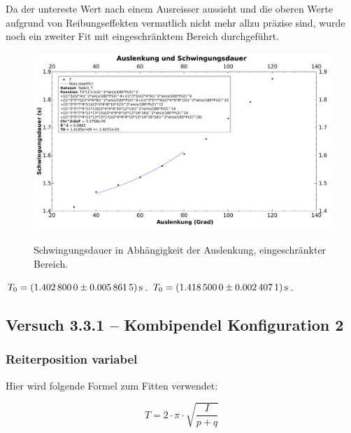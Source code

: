 Da der  untereste Wert  nach einem  Ausreisser aussieht  und die  oberen Werte
aufgrund  von Reibungseffekten  vermutlich  nicht mehr  allzu pr\"azise  sind,
wurde noch ein zweiter Fit mit eingeschr\"anktem Bereich durchgef\"uhrt.

\begin{figure}[h!]
    \centering
    \includegraphics[width=\textwidth]{images/313b.pdf}
    \label{fig:pendelKonfigs}
    \caption{%
        Schwingungsdauer in Abh\"angigkeit der Auslenkung, eingeschr\"ankter Bereich.
    }
\end{figure}
$T_0  = \SI[separate-uncertainty = true]{1.4028 \pm 0.0058615}{\second}$.
$T_0  = \SI[separate-uncertainty = true]{1.4185 \pm 0.0024071}{\second}$.

\clearpage
\subsection{Versuch 3.3.1 -- Kombipendel Konfiguration 2}
\label{subsec:kombiKonfig2}


\subsubsection{Reiterposition variabel}

Hier wird folgende Formel zum Fitten verwendet:

\begin{equation}
    T = 2 \cdot \pi \cdot \sqrt{\frac{I}{p + q}}
\end{equation}

